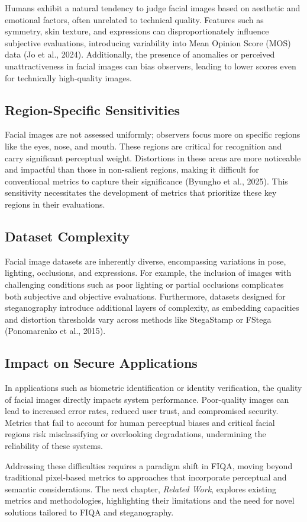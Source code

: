 Humans exhibit a natural tendency to judge facial images based on aesthetic and emotional factors, often unrelated to technical quality. Features such as symmetry, skin texture, and expressions can disproportionately influence subjective evaluations, introducing variability into Mean Opinion Score (MOS) data (Jo et al., 2024). Additionally, the presence of anomalies or perceived unattractiveness in facial images can bias observers, leading to lower scores even for technically high-quality images.

\subsection{Region-Specific Sensitivities}

Facial images are not assessed uniformly; observers focus more on specific regions like the eyes, nose, and mouth. These regions are critical for recognition and carry significant perceptual weight. Distortions in these areas are more noticeable and impactful than those in non-salient regions, making it difficult for conventional metrics to capture their significance (Byungho et al., 2025). This sensitivity necessitates the development of metrics that prioritize these key regions in their evaluations.

\subsection{Dataset Complexity}

Facial image datasets are inherently diverse, encompassing variations in pose, lighting, occlusions, and expressions. For example, the inclusion of images with challenging conditions such as poor lighting or partial occlusions complicates both subjective and objective evaluations. Furthermore, datasets designed for steganography introduce additional layers of complexity, as embedding capacities and distortion thresholds vary across methods like StegaStamp or FStega (Ponomarenko et al., 2015).

\subsection{Impact on Secure Applications}

In applications such as biometric identification or identity verification, the quality of facial images directly impacts system performance. Poor-quality images can lead to increased error rates, reduced user trust, and compromised security. Metrics that fail to account for human perceptual biases and critical facial regions risk misclassifying or overlooking degradations, undermining the reliability of these systems.

Addressing these difficulties requires a paradigm shift in FIQA, moving beyond traditional pixel-based metrics to approaches that incorporate perceptual and semantic considerations. The next chapter, \textit{Related Work}, explores existing metrics and methodologies, highlighting their limitations and the need for novel solutions tailored to FIQA and steganography.
